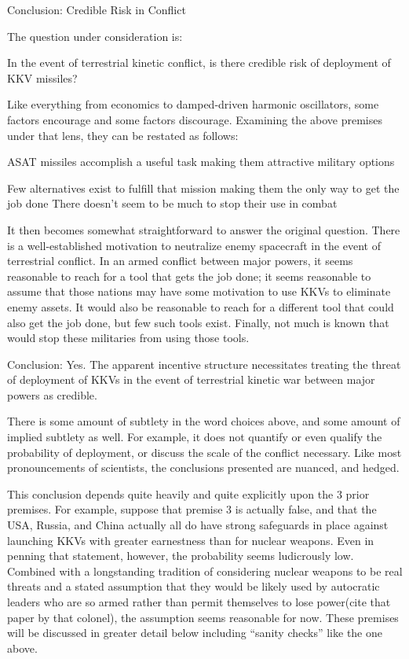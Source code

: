 Conclusion: Credible Risk in Conflict

The question under consideration is:

In the event of terrestrial kinetic conflict, is there credible risk
of deployment of KKV missiles?

Like everything from economics to damped-driven harmonic oscillators,
some factors encourage and some factors discourage.  Examining the
above premises under that lens, they can be restated as follows:

ASAT missiles accomplish a useful task making them attractive military options

Few alternatives exist to fulfill that mission making them the only way to get the job done
There doesn't seem to be much to stop their use in combat

It then becomes somewhat straightforward to answer the original
question.  There is a well-established motivation to neutralize enemy
spacecraft in the event of terrestrial conflict.  In an armed conflict
between major powers, it seems reasonable to reach for a tool that
gets the job done; it seems reasonable to assume that those nations
may have some motivation to use KKVs to eliminate enemy assets.  It
would also be reasonable to reach for a different tool that could also
get the job done, but few such tools exist.  Finally, not much is
known that would stop these militaries from using those tools.

Conclusion: Yes.  The apparent incentive structure necessitates
treating the threat of deployment of KKVs in the event of terrestrial
kinetic war between major powers as credible.

There is some amount of subtlety in the word choices above, and some
amount of implied subtlety as well.  For example, it does not quantify
or even qualify the probability of deployment, or discuss the scale of
the conflict necessary.  Like most pronouncements of scientists, the
conclusions presented are nuanced, and hedged.

This conclusion depends quite heavily and quite explicitly upon the 3
prior premises.  For example, suppose that premise 3 is actually
false, and that the USA, Russia, and China actually all do have strong
safeguards in place against launching KKVs with greater earnestness
than for nuclear weapons.  Even in penning that statement, however,
the probability seems ludicrously low.  Combined with a longstanding
tradition of considering nuclear weapons to be real threats and a
stated assumption that they would be likely used by autocratic leaders
who are so armed rather than permit themselves to lose power(cite that
paper by that colonel), the assumption seems reasonable for now.
These premises will be discussed in greater detail below including
``sanity checks'' like the one above.

